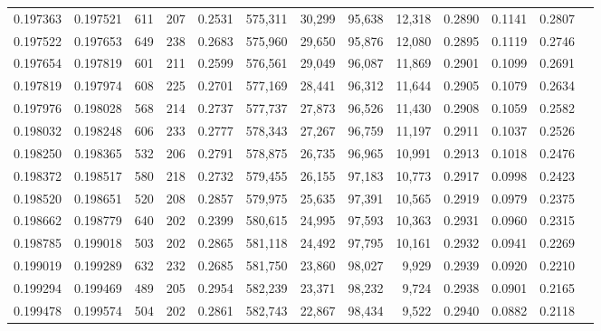 \begin{tabular}{rrrrrrrrrrrrr}
0.197363 & 0.197521 &   611 & 207 &                                     0.2531 & 575,311 &  30,299 &  95,638 &  12,318 & 0.2890 & 0.1141 & 0.2807 \\
0.197522 & 0.197653 &   649 & 238 &                                     0.2683 & 575,960 &  29,650 &  95,876 &  12,080 & 0.2895 & 0.1119 & 0.2746 \\
0.197654 & 0.197819 &   601 & 211 &                                     0.2599 & 576,561 &  29,049 &  96,087 &  11,869 & 0.2901 & 0.1099 & 0.2691 \\
0.197819 & 0.197974 &   608 & 225 &                                     0.2701 & 577,169 &  28,441 &  96,312 &  11,644 & 0.2905 & 0.1079 & 0.2634 \\
0.197976 & 0.198028 &   568 & 214 &                                     0.2737 & 577,737 &  27,873 &  96,526 &  11,430 & 0.2908 & 0.1059 & 0.2582 \\
0.198032 & 0.198248 &   606 & 233 &                                     0.2777 & 578,343 &  27,267 &  96,759 &  11,197 & 0.2911 & 0.1037 & 0.2526 \\
0.198250 & 0.198365 &   532 & 206 &                                     0.2791 & 578,875 &  26,735 &  96,965 &  10,991 & 0.2913 & 0.1018 & 0.2476 \\
0.198372 & 0.198517 &   580 & 218 &                                     0.2732 & 579,455 &  26,155 &  97,183 &  10,773 & 0.2917 & 0.0998 & 0.2423 \\
0.198520 & 0.198651 &   520 & 208 &                                     0.2857 & 579,975 &  25,635 &  97,391 &  10,565 & 0.2919 & 0.0979 & 0.2375 \\
0.198662 & 0.198779 &   640 & 202 &                                     0.2399 & 580,615 &  24,995 &  97,593 &  10,363 & 0.2931 & 0.0960 & 0.2315 \\
0.198785 & 0.199018 &   503 & 202 &                                     0.2865 & 581,118 &  24,492 &  97,795 &  10,161 & 0.2932 & 0.0941 & 0.2269 \\
0.199019 & 0.199289 &   632 & 232 &                                     0.2685 & 581,750 &  23,860 &  98,027 &   9,929 & 0.2939 & 0.0920 & 0.2210 \\
0.199294 & 0.199469 &   489 & 205 &                                     0.2954 & 582,239 &  23,371 &  98,232 &   9,724 & 0.2938 & 0.0901 & 0.2165 \\
0.199478 & 0.199574 &   504 & 202 &                                     0.2861 & 582,743 &  22,867 &  98,434 &   9,522 & 0.2940 & 0.0882 & 0.2118 \\

\end{tabular}
